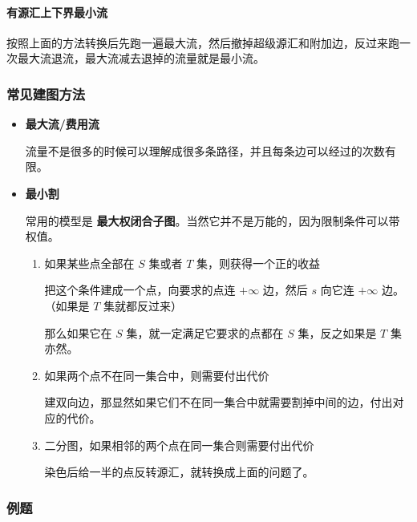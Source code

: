 \paragraph{有源汇上下界最小流}
按照上面的方法转换后先跑一遍最大流，然后撤掉超级源汇和附加边，反过来跑一次最大流退流，最大流减去退掉的流量就是最小流。

\subsubsection{常见建图方法}

\begin{itemize}

\item \textbf{最大流/费用流}

流量不是很多的时候可以理解成很多条路径，并且每条边可以经过的次数有限。

\item \textbf{最小割}

常用的模型是 \textbf{最大权闭合子图}。当然它并不是万能的，因为限制条件可以带权值。

\begin{enumerate}

\item 如果某些点全部在 $S$ 集或者 $T$ 集，则获得一个正的收益

把这个条件建成一个点，向要求的点连 $+\infty$ 边，然后 $s$ 向它连 $+\infty$ 边。（如果是 $T$ 集就都反过来）

那么如果它在 $S$ 集，就一定满足它要求的点都在 $S$ 集，反之如果是 $T$ 集亦然。

\item 如果两个点不在同一集合中，则需要付出代价

建双向边，那显然如果它们不在同一集合中就需要割掉中间的边，付出对应的代价。

\item 二分图，如果相邻的两个点在同一集合则需要付出代价

染色后给一半的点反转源汇，就转换成上面的问题了。

\end{enumerate}

\end{itemize}

\subsubsection{例题}

